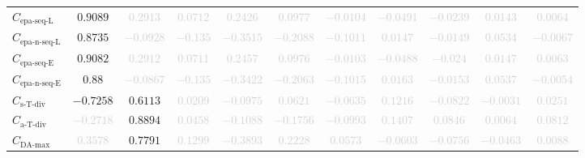 \documentclass{standalone}
\newcommand{\damaxname}{\text{DA-max}}
\newcommand{\damax}{C_{\damaxname}}
\newcommand{\simpletracedivname}{\text{s-T-div}}
\newcommand{\simpletracediv}{C_{\simpletracedivname}}
\newcommand{\advtracedivname}{\text{a-T-div}}
\newcommand{\advtracediv}{C_{\advtracedivname}}
\newcommand{\epasequencelname}{\text{epa-seq-L}}
\newcommand{\epasequencel}{C_{\epasequencelname}}
\newcommand{\epanormsequencelname}{\text{epa-n-seq-L}}
\newcommand{\epanormsequencel}{C_{\epanormsequencelname}}
\newcommand{\epasequenceename}{\text{epa-seq-E}}
\newcommand{\epasequencee}{C_{\epasequenceename}}
\newcommand{\epanormsequenceename}{\text{epa-n-seq-E}}
\newcommand{\epanormsequencee}{C_{\epanormsequenceename}}
\begin{document}
\begin{tabular}{lcccccccccc}
$\epasequencel$ & $0.9089$ & \textcolor{lightgray}{$0.2913$} & \textcolor{lightgray}{$0.0712$} & \textcolor{lightgray}{$0.2426$} & \textcolor{lightgray}{$0.0977$} & \textcolor{lightgray}{$-0.0104$} & \textcolor{lightgray}{$-0.0491$} & \textcolor{lightgray}{$-0.0239$} & \textcolor{lightgray}{$0.0143$} & \textcolor{lightgray}{$0.0064$} \\ 
$\epanormsequencel$ & $0.8735$ & \textcolor{lightgray}{$-0.0928$} & \textcolor{lightgray}{$-0.135$} & \textcolor{lightgray}{$-0.3515$} & \textcolor{lightgray}{$-0.2088$} & \textcolor{lightgray}{$-0.1011$} & \textcolor{lightgray}{$0.0147$} & \textcolor{lightgray}{$-0.0149$} & \textcolor{lightgray}{$0.0534$} & \textcolor{lightgray}{$-0.0067$} \\ 
$\epasequencee$ & $0.9082$ & \textcolor{lightgray}{$0.2912$} & \textcolor{lightgray}{$0.0711$} & \textcolor{lightgray}{$0.2457$} & \textcolor{lightgray}{$0.0976$} & \textcolor{lightgray}{$-0.0103$} & \textcolor{lightgray}{$-0.0488$} & \textcolor{lightgray}{$-0.024$} & \textcolor{lightgray}{$0.0147$} & \textcolor{lightgray}{$0.0063$} \\ 
$\epanormsequencee$ & $0.88$ & \textcolor{lightgray}{$-0.0867$} & \textcolor{lightgray}{$-0.135$} & \textcolor{lightgray}{$-0.3422$} & \textcolor{lightgray}{$-0.2063$} & \textcolor{lightgray}{$-0.1015$} & \textcolor{lightgray}{$0.0163$} & \textcolor{lightgray}{$-0.0153$} & \textcolor{lightgray}{$0.0537$} & \textcolor{lightgray}{$-0.0054$} \\ 
$\simpletracediv$ & $-0.7258$ & $0.6113$ & \textcolor{lightgray}{$0.0209$} & \textcolor{lightgray}{$-0.0975$} & \textcolor{lightgray}{$0.0621$} & \textcolor{lightgray}{$-0.0635$} & \textcolor{lightgray}{$0.1216$} & \textcolor{lightgray}{$-0.0822$} & \textcolor{lightgray}{$-0.0031$} & \textcolor{lightgray}{$0.0251$} \\ 
$\advtracediv$ & \textcolor{lightgray}{$-0.2718$} & $0.8894$ & \textcolor{lightgray}{$0.0458$} & \textcolor{lightgray}{$-0.1088$} & \textcolor{lightgray}{$-0.1756$} & \textcolor{lightgray}{$-0.0993$} & \textcolor{lightgray}{$0.1407$} & \textcolor{lightgray}{$0.0846$} & \textcolor{lightgray}{$0.0064$} & \textcolor{lightgray}{$0.0812$} \\ 
$\damax$ & \textcolor{lightgray}{$0.3578$} & $0.7791$ & \textcolor{lightgray}{$0.1299$} & \textcolor{lightgray}{$-0.3893$} & \textcolor{lightgray}{$0.2228$} & \textcolor{lightgray}{$0.0573$} & \textcolor{lightgray}{$-0.0603$} & \textcolor{lightgray}{$-0.0756$} & \textcolor{lightgray}{$-0.0463$} & \textcolor{lightgray}{$0.0088$} \\ 

\end{tabular}
\end{document}
